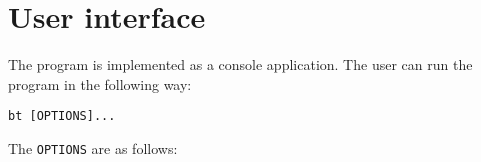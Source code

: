 





\chapter{User interface}
The program is implemented as a console application. The user can run the program in the following way:

\begin{verbatim}
bt [OPTIONS]...
\end{verbatim}

The \verb+OPTIONS+ are as follows:

